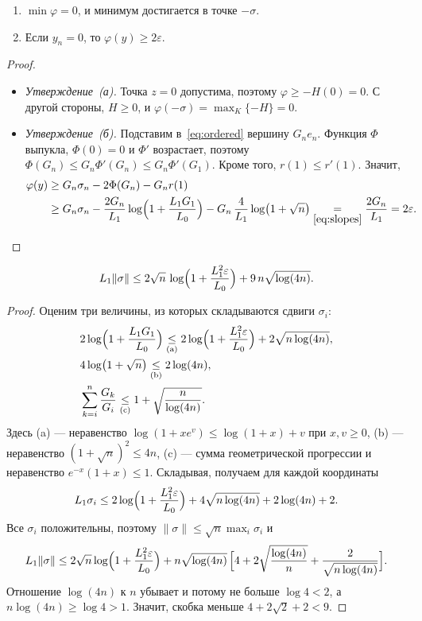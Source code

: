\documentclass[11pt,a4paper]{article}
\newcommand{\norm}[1]{\|#1\|}
\newcommand{\by}[2]{\mathrel{\underset{#2}{#1}}}
\begin{document}
\begin{lemma}\label{lem:ord-gap}
\leavevmode
\begin{enumerate}
\item[(а)] $\min\varphi=0$, и минимум достигается в точке $-\sigma$.
\item[(б)] Если $y_n=0$, то $\varphi(y)\ge2\varepsilon$.
\end{enumerate}
\end{lemma}

\begin{proof}
\leavevmode
\begin{itemize}
\item \emph{Утверждение~(а).} Точка $z=0$ допустима, поэтому $\varphi\ge-H(0)=0$. С другой стороны, $H\ge0$, и $\varphi(-\sigma)=\max_K\{-H\}=0$.
\item \emph{Утверждение~(б).} Подставим в~\eqref{eq:ordered} вершину $G_ne_n$. Функция $\Phi$ выпукла, $\Phi(0)=0$ и $\Phi'$ возрастает, поэтому $\Phi(G_n)\le G_n\Phi'(G_n)\le G_n\Phi'(G_1)$. Кроме того, $r(1)\le r'(1)$. Значит,
\begin{align*}
 \varphi(y)
 &\ge G_n\sigma_n-2\Phi(G_n)-G_nr(1)\\
 &\ge G_n\sigma_n-\frac{2G_n}{L_1}\log\Bigl(1+\frac{L_1G_1}{L_0}\Bigr)-G_n\,\frac4{L_1}\log\bigl(1+\sqrt n\bigr)
 \by{=}{\eqref{eq:slopes}}\frac{2G_n}{L_1}=2\varepsilon .\qedhere
\end{align*}
\end{itemize}
\end{proof}

\begin{lemma}\label{lem:ord-radius}
\[
 L_1\norm\sigma\le2\sqrt n\,\log\Bigl(1+\frac{L_1^2\varepsilon}{L_0}\Bigr)+9\,n\sqrt{\log(4n)} .
\]
\end{lemma}

\begin{proof}
Оценим три величины, из которых складываются сдвиги $\sigma_i$:
\begin{align*}
 &2\log\Bigl(1+\frac{L_1G_1}{L_0}\Bigr)\by{\le}{(\mathrm a)}2\log\Bigl(1+\frac{L_1^2\varepsilon}{L_0}\Bigr)+2\sqrt{n\log(4n)},\\
 &4\log\bigl(1+\sqrt n\bigr)\by{\le}{(\mathrm b)}2\log(4n),\\
 &\sum_{k=i}^n\frac{G_k}{G_i}\by{\le}{(\mathrm c)}1+\sqrt{\frac n{\log(4n)}} .
\end{align*}
Здесь (a) --- неравенство $\log(1+xe^v)\le\log(1+x)+v$ при $x,v\ge0$, (b) --- неравенство $(1+\sqrt n)^2\le4n$, (c) --- сумма геометрической прогрессии и неравенство $e^{-x}(1+x)\le1$. Складывая, получаем для каждой координаты
\[
 L_1\sigma_i\le2\log\Bigl(1+\frac{L_1^2\varepsilon}{L_0}\Bigr)+4\sqrt{n\log(4n)}+2\log(4n)+2 .
\]
Все $\sigma_i$ положительны, поэтому $\norm\sigma\le\sqrt n\max_i\sigma_i$ и
\[
 L_1\norm\sigma\le2\sqrt n\log\Bigl(1+\frac{L_1^2\varepsilon}{L_0}\Bigr)+n\sqrt{\log(4n)}\,\Bigl[4+2\sqrt{\frac{\log(4n)}n}+\frac2{\sqrt{n\log(4n)}}\Bigr].
\]
Отношение $\log(4n)$ к $n$ убывает и потому не больше $\log4<2$, а $n\log(4n)\ge\log4>1$. Значит, скобка меньше $4+2\sqrt2+2<9$.
\end{proof}
\end{document}
